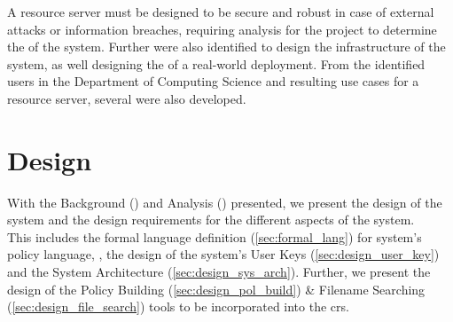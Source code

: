\documentclass[british]{l4proj}
\begin{document}
A resource server must be designed to be secure and robust in case of external attacks or information breaches, requiring analysis for the project to determine the  of the system. Further  were also identified to design the infrastructure of the system, as well designing the  of a real-world deployment. From the identified users in the Department of Computing Science and resulting use cases for a resource server, several  were also developed.









\chapter{Design}
\label{ch:design}

With the Background () and Analysis () presented, we present the design of the \theResServer system and the design requirements for the different aspects of the system.\\
This includes the formal language definition (\cref{sec:formal_lang}) for \theResServer system's policy language, \thePolicyLang, the design of the system's User Keys (\cref{sec:design_user_key}) and the System Architecture (\cref{sec:design_sys_arch}). Further, we present the design of the Policy Building (\cref{sec:design_pol_build}) \& Filename Searching (\cref{sec:design_file_search}) tools to be incorporated into the \acrfull{crs}.













\end{document}
